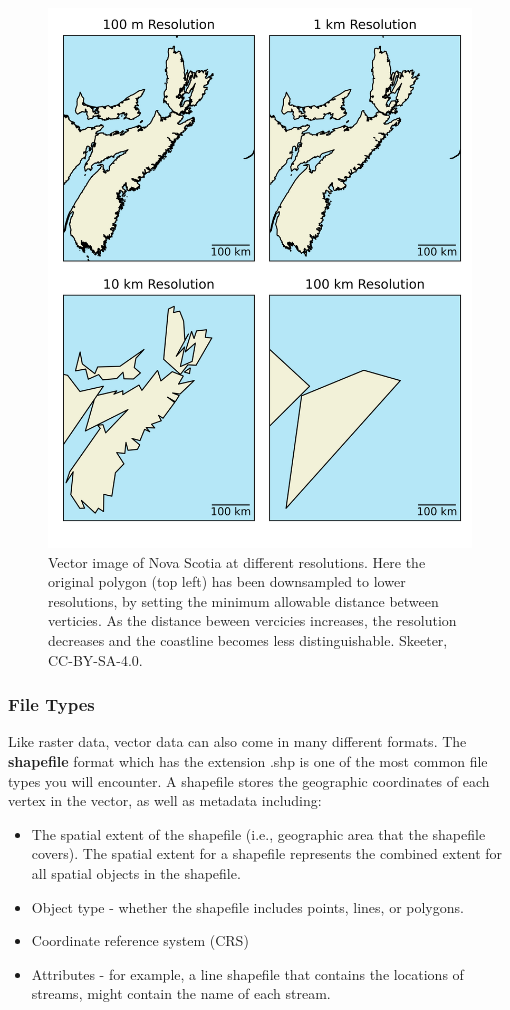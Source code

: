 \documentclass[
]{book}
\providecommand{\tightlist}{%
  \setlength{\itemsep}{0pt}\setlength{\parskip}{0pt}}
\begin{document}
\begin{figure}
\includegraphics[width=0.75\linewidth]{images/03-vector-resolution} \caption{Vector image of Nova Scotia at different resolutions.  Here the original polygon (top left) has been downsampled to lower resolutions, by setting the minimum allowable distance between verticies.  As the distance beween vercicies increases, the resolution decreases and the coastline becomes less distinguishable. Skeeter, CC-BY-SA-4.0.}\label{fig:3-vector-resolution}
\end{figure}

\hypertarget{file-types}{%
\subsubsection{File Types}\label{file-types}}

Like raster data, vector data can also come in many different formats. The \textbf{shapefile} format which has the extension .shp is one of the most common file types you will encounter. A shapefile stores the geographic coordinates of each vertex in the vector, as well as metadata including:

\begin{itemize}
\tightlist
\item
  The spatial extent of the shapefile (i.e., geographic area that the shapefile covers). The spatial extent for a shapefile represents the combined extent for all spatial objects in the shapefile.
\item
  Object type - whether the shapefile includes points, lines, or polygons.
\item
  Coordinate reference system (CRS)
\item
  Attributes - for example, a line shapefile that contains the locations of streams, might contain the name of each stream.
\end{itemize}
\end{document}
